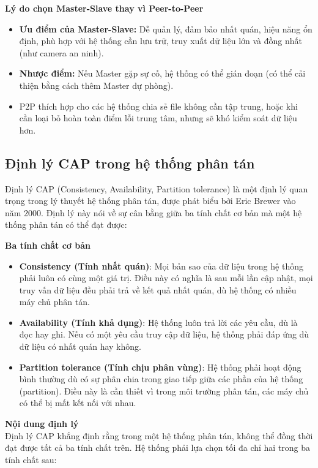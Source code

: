 \documentclass[../main.tex]{subfiles}
\begin{document}
\textbf{Lý do chọn Master-Slave thay vì Peer-to-Peer}
\begin{itemize}
    \item \textbf{Ưu điểm của Master-Slave:} Dễ quản lý, đảm bảo nhất quán, hiệu năng ổn định, phù hợp với hệ thống cần lưu trữ, truy xuất dữ liệu lớn và đồng nhất (như camera an ninh).
    \item \textbf{Nhược điểm:} Nếu Master gặp sự cố, hệ thống có thể gián đoạn (có thể cải thiện bằng cách thêm Master dự phòng).
    \item P2P thích hợp cho các hệ thống chia sẻ file không cần tập trung, hoặc khi cần loại bỏ hoàn toàn điểm lỗi trung tâm, nhưng sẽ khó kiểm soát dữ liệu hơn.
\end{itemize}
\subsection{Định lý CAP trong hệ thống phân tán}

Định lý CAP (Consistency, Availability, Partition tolerance) là một định lý quan trọng trong lý thuyết hệ thống phân tán, được phát biểu bởi Eric Brewer vào năm 2000. Định lý này nói về sự cân bằng giữa ba tính chất cơ bản mà một hệ thống phân tán có thể đạt được:

\textbf{Ba tính chất cơ bản}

\begin{itemize}
   \item \textbf{Consistency (Tính nhất quán)}: Mọi bản sao của dữ liệu trong hệ thống phải luôn có cùng một giá trị. Điều này có nghĩa là sau mỗi lần cập nhật, mọi truy vấn dữ liệu đều phải trả về kết quả nhất quán, dù hệ thống có nhiều máy chủ phân tán.
   
   \item \textbf{Availability (Tính khả dụng)}: Hệ thống luôn trả lời các yêu cầu, dù là đọc hay ghi. Nếu có một yêu cầu truy cập dữ liệu, hệ thống phải đáp ứng dù dữ liệu có nhất quán hay không.
   
   \item \textbf{Partition tolerance (Tính chịu phân vùng)}: Hệ thống phải hoạt động bình thường dù có sự phân chia trong giao tiếp giữa các phần của hệ thống (partition). Điều này là cần thiết vì trong môi trường phân tán, các máy chủ có thể bị mất kết nối với nhau.
\end{itemize}

\textbf{Nội dung định lý}\\
Định lý CAP khẳng định rằng trong một hệ thống phân tán, không thể đồng thời đạt được tất cả ba tính chất trên. Hệ thống phải lựa chọn tối đa chỉ hai trong ba tính chất sau:
\end{document}

